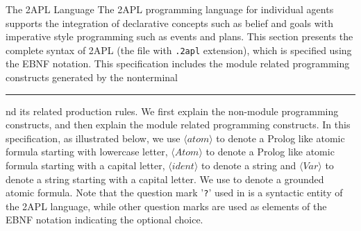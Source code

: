 \begin{chapter}{The 2APL Language}
    The 2APL programming language for individual agents supports the integration of declarative
    concepts such as belief and goals with imperative style programming such as
    events and plans. This section presents the complete syntax of 2APL (the file
    with {\tt .2apl} extension), which is
    specified using the EBNF notation. This specification includes the
    module related programming constructs generated by the nonterminal
    \rule{moduleaction} and its related production rules. We first
    explain the non-module programming constructs, and then explain
    the module related programming constructs.
    In this specification, as illustrated below,
    we use $\langle atom\rangle$ to denote a Prolog like
    atomic formula starting with lowercase letter, $\langle Atom\rangle$ to denote
    a Prolog like atomic formula starting with a capital letter, $\langle
    ident\rangle$ to denote a string and $\langle Var\rangle$ to denote a string
    starting with a capital letter. We use  to denote a grounded
    atomic formula. Note that the question mark '{\tt ?}' used in 
    is a syntactic entity of the 2APL language, while other question marks are
    used as elements of the EBNF notation indicating the optional choice.


\end{chapter}
